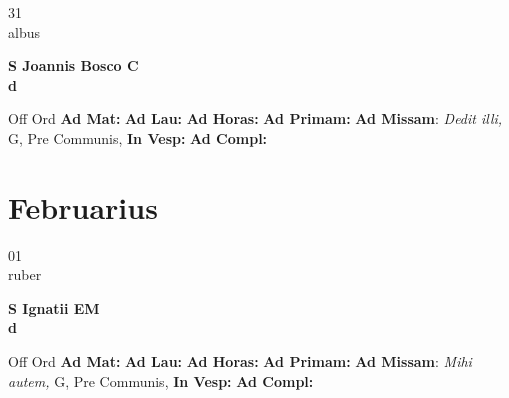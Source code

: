 \documentclass[10pt, openany]{book}
\begin{document}
    \begin{center}
        \begin{minipage}{3.5in}
            \vspace{2em}
            \begin{minipage}{0.5in}
                {\Huge 31} \\
                {\normalsize albus}
            \end{minipage}
            \begin{minipage}{3.0in}
                \textbf{ \large S Joannis Bosco C \\
                \textnormal{\normalsize d}}

            \end{minipage}
            \begin{justify}Off Ord
                \textbf{Ad Mat: }
                \textbf{Ad Lau: }
                \textbf{Ad Horas: }
                \textbf{Ad Primam: }\textbf{Ad Missam}: \textit{Dedit illi,} G, Pre Communis, 
                \textbf{In Vesp: }
                \textbf{Ad Compl: }
            \end{justify}
        \end{minipage}
    \end{center}

    \chapter{Februarius}
                    
    \begin{center}
        \begin{minipage}{3.5in}
            \vspace{2em}
            \begin{minipage}{0.5in}
                {\Huge 01} \\
                {\normalsize ruber}
            \end{minipage}
            \begin{minipage}{3.0in}
                \textbf{ \large S Ignatii EM \\
                \textnormal{\normalsize d}}

            \end{minipage}
            \begin{justify}Off Ord
                \textbf{Ad Mat: }
                \textbf{Ad Lau: }
                \textbf{Ad Horas: }
                \textbf{Ad Primam: }\textbf{Ad Missam}: \textit{Mihi autem,} G, Pre Communis, 
                \textbf{In Vesp: }
                \textbf{Ad Compl: }
            \end{justify}
        \end{minipage}
    \end{center}
\end{document}
